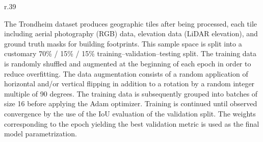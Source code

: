 \begin{wrapfigure}[9]{r}{.39\textwidth}
\end{wrapfigure}

The Trondheim dataset produces \numtiles geographic tiles after being processed, each tile including aerial photography (RGB) data, elevation data (LiDAR elevation), and ground truth masks for building footprints.
This sample space is split into a customary 70\% / 15\% / 15\% training--validation--testing split.
The training data is randomly shuffled and augmented at the beginning of each epoch in order to reduce overfitting.
The data augmentation consists of a random application of horizontal and/or vertical flipping in addition to a rotation by a random integer multiple of 90 degrees.
The training data is subsequently grouped into batches of size 16 before applying the Adam optimizer.
Training is continued until observed convergence by the use of the IoU evaluation of the validation split.
The weights corresponding to the epoch yielding the best validation metric is used as the final model parametrization.

